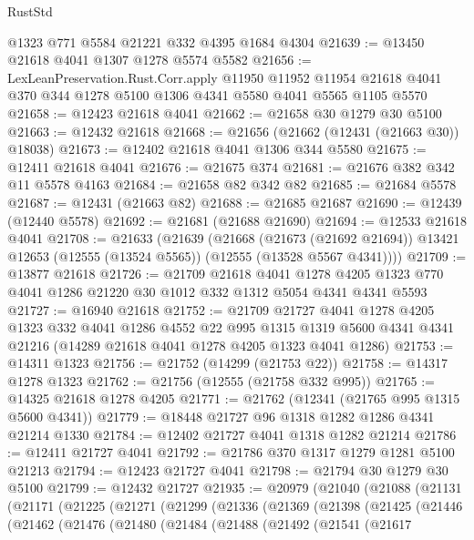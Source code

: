 \begin{lexlean}{RustStd}
\begin{coremodule}
    @1323
    @771
    @5584
    @21221
    @332
    @4395
    @1684
    @4304
@21639 := @13450 @21618 @4041 @1307 @1278 @5574 @5582
@21656 := LexLeanPreservation.Rust.Corr.apply
    @11950
    @11952
    @11954
    @21618
    @4041
    @370
    @344
    @1278
    @5100
    @1306
    @4341
    @5580
    @4041
    @5565
    @1105
    @5570
@21658 := @12423 @21618 @4041
@21662 := @21658 @30 @1279 @30 @5100
@21663 := @12432 @21618
@21668 := @21656 (@21662 (@12431 (@21663 @30)) @18038)
@21673 := @12402 @21618 @4041 @1306 @344 @5580
@21675 := @12411 @21618 @4041
@21676 := @21675 @374
@21681 := @21676 @382 @342 @11 @5578 @4163
@21684 := @21658 @82 @342 @82
@21685 := @21684 @5578
@21687 := @12431 (@21663 @82)
@21688 := @21685 @21687
@21690 := @12439 (@12440 @5578)
@21692 := @21681 (@21688 @21690)
@21694 := @12533 @21618 @4041
@21708 := @21633
    (@21639
      (@21668
        (@21673 (@21692 @21694))
        @13421
        @12653
        (@12555 (@13524 @5565))
        (@12555 (@13528 @5567 @4341))))
@21709 := @13877 @21618
@21726 := @21709
    @21618
    @4041
    @1278
    @4205
    @1323
    @770
    @4041
    @1286
    @21220
    @30
    @1012
    @332
    @1312
    @5054
    @4341
    @4341
    @5593
@21727 := @16940 @21618
@21752 := @21709
    @21727
    @4041
    @1278
    @4205
    @1323
    @332
    @4041
    @1286
    @4552
    @22
    @995
    @1315
    @1319
    @5600
    @4341
    @4341
    @21216
    (@14289 @21618 @4041 @1278 @4205 @1323 @4041 @1286)
@21753 := @14311 @1323
@21756 := @21752 (@14299 (@21753 @22))
@21758 := @14317 @1278 @1323
@21762 := @21756 (@12555 (@21758 @332 @995))
@21765 := @14325 @21618 @1278 @4205
@21771 := @21762 (@12341 (@21765 @995 @1315 @5600 @4341))
@21779 := @18448 @21727 @96 @1318 @1282 @1286 @4341 @21214 @1330
@21784 := @12402 @21727 @4041 @1318 @1282 @21214
@21786 := @12411 @21727 @4041
@21792 := @21786 @370 @1317 @1279 @1281 @5100 @21213
@21794 := @12423 @21727 @4041
@21798 := @21794 @30 @1279 @30 @5100
@21799 := @12432 @21727
@21935 := @20979
    (@21040
      (@21088
        (@21131
          (@21171
            (@21225
              (@21271
                (@21299
                  (@21336
                    (@21369
                      (@21398
                        (@21425
                          (@21446
                            (@21462
                              (@21476
                                (@21480
                                  (@21484
                                    (@21488
                                      (@21492
                                        (@21541
                                          (@21617

\end{coremodule}
\end{lexlean}
